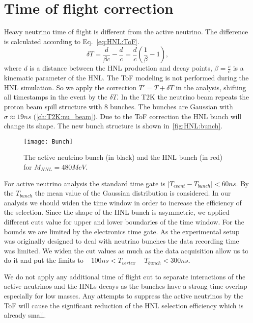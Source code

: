 \documentclass[../main.tex]{subfiles}
\begin{document}
\section{Time of flight correction}
\label{sec:HNL:tof_corr}
Heavy neutrino time of flight is different from the active neutrino. The difference is calculated according to Eq.~\ref{eq:HNL:ToF}.
\begin{equation}
  \delta T=\frac{d}{\beta c}-\frac{d}{c}=\frac{d}{c}\left(\frac{1}{\beta}-1\right),
  \label{eq:HNL:ToF}
\end{equation}
where $d$ is a distance between the HNL production and decay points, $\beta=\frac{v}{c}$ is a kinematic parameter of the HNL. The ToF modeling is not performed during the HNL simulation. So we apply the correction $T'=T+\delta T$ in the analysis, shifting all timestamps in the event by the $\delta T$. In the T2K the  neutrino beam repeats the proton beam spill structure with 8 bunches. The bunches are Gaussian with $\sigma\approx19ns$ (\autoref{ch:T2K:nu_beam}). Due to the ToF correction the HNL bunch will change its shape. The new bunch structure is shown in~\autoref{fig:HNL:bunch}.
\begin{figure}[!ht]
  \begin{center}
  \texttt{[image: Bunch]}
  \caption{The active neutrino bunch (in black) and the HNL bunch (in red) for $M_{HNL}=480MeV$.}
  \label{fig:HNL:bunch}
  \end{center}
\end{figure}

For active neutrino analysis the standard time gate is $\left|T_{event}-T_{bunch}\right|<60ns$. By the $T_{bunch}$ the mean value of the Gaussian distribution is considered. In our analysis we should widen the time window in order to increase the efficiency of the selection. Since the shape of the HNL bunch is asymmetric, we applied different cuts value for upper and lower boundaries of the time window. For the bounds we are limited by the electronics time gate. As the experimental setup was originally designed to deal with neutrino bunches the data recording time was limited. We widen the cut values as much as the data acquisition allow us to do it and put the limits to $-100ns<T_{vertex}-T_{bunch}<300ns$.

We do not apply any additional time of flight cut to separate interactions of the active neutrinos and the HNLs decays as the bunches have a strong time overlap especially for low masses. Any attempts to suppress the active neutrinos by the ToF will cause the significant reduction of the HNL selection efficiency which is already small.
\end{document}
